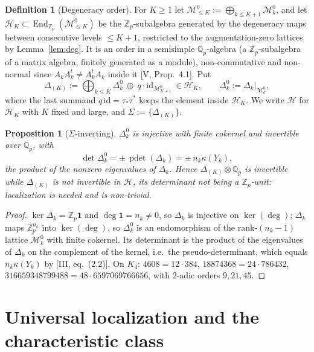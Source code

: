 \documentclass[11pt]{amsart}
\numberwithin{equation}{section}
\newtheorem{proposition}[theorem]{Proposition}
\theoremstyle{definition}
\newtheorem{definition}[theorem]{Definition}
\theoremstyle{remark}
\newcommand{\Z}{\mathbb{Z}}
\newcommand{\Q}{\mathbb{Q}}
\newcommand{\Zp}{\Z_p}
\newcommand{\Qp}{\Q_p}
\newcommand{\cH}{\mathcal{H}}
\newcommand{\cM}{\mathcal{M}}
\newcommand{\pdet}{\operatorname{pdet}}
\newcommand{\End}{\operatorname{End}}
\newcommand{\ta}{\tau_*}
\newcommand{\taup}{\tau^*}
\begin{document}
\begin{definition}[Degeneracy order]\label{def:order}
For $K\ge1$ let $\cM^{0}_{\le K}:=\bigoplus_{k\le K+1}\cM^{0}_k$, and let
$\cH_K\subset\End_{\Zp}(\cM^{0}_{\le K})$ be the $\Zp$-subalgebra generated by the degeneracy
maps between consecutive levels $\le K{+}1$, restricted to the augmentation-zero lattices by
Lemma~\ref{lem:deg}. It is an order in a semisimple $\Qp$-algebra (a $\Zp$-subalgebra of a
matrix algebra, finitely generated as a module), non-commutative and non-normal since
$A_kA_k^{t}\ne A_k^{t}A_k$ inside it {\rm[V, Prop.~4.1]}. Put
\[
\Delta_{(K)}:=\bigoplus_{k\le K}\Delta_k^{0}\ \oplus\ q\cdot\mathrm{id}_{\cM^{0}_{K+1}}\ \in\cH_K,
\qquad \Delta_k^{0}:=\Delta_k|_{\cM^{0}_k},
\]
where the last summand $q\,\mathrm{id}=\ta\taup$ keeps the element inside $\cH_K$. We write
$\cH$ for $\cH_K$ with $K$ fixed and large, and $\Sigma:=\{\Delta_{(K)}\}$.
\end{definition}

\begin{proposition}[$\Sigma$-inverting]\label{prop:sigma}
$\Delta_k^{0}$ is injective with finite cokernel and invertible over $\Qp$, with
\[
\det\Delta_k^{0}=\pm\,\pdet(\Delta_k)=\pm\,n_k\kappa(Y_k),
\]
the product of the nonzero eigenvalues of $\Delta_k$. Hence $\Delta_{(K)}\otimes\Qp$ is
invertible while $\Delta_{(K)}$ is not invertible in $\cH$, its determinant not being a
$\Zp$-unit: localization is needed and is non-trivial.
\end{proposition}

\begin{proof}
$\ker\Delta_k=\Zp\mathbf1$ and $\deg\mathbf1=n_k\ne0$, so $\Delta_k$ is injective on
$\ker(\deg)$; $\Delta_k$ maps $\Zp^{n_k}$ into $\ker(\deg)$, so $\Delta_k^{0}$ is an
endomorphism of the rank-$(n_k-1)$ lattice $\cM^{0}_k$ with finite cokernel. Its determinant
is the product of the eigenvalues of $\Delta_k$ on the complement of the kernel, i.e.\ the
pseudo-determinant, which equals $n_k\kappa(Y_k)$ by [III, eq.~(2.2)]. On $K_4$:
$4608=12\cdot384$, $18874368=24\cdot786432$, $316659348799488=48\cdot6597069766656$, with
$2$-adic orders $9,21,45$.
\end{proof}

\section{Universal localization and the characteristic class}\label{sec:loc}
\end{document}

